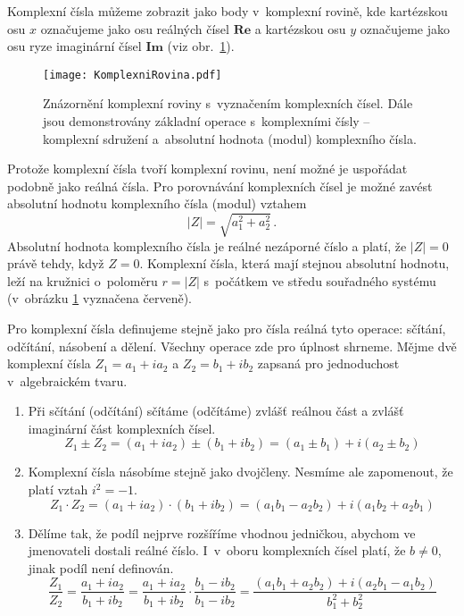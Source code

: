 Komplexní čísla můžeme zobrazit jako body v~komplexní rovině, kde kartézskou osu $x$ označujeme jako osu reálných čísel $\mathbf{Re}$ a kartézskou osu $y$ označujeme jako osu ryze imaginární čísel $\mathbf{Im}$ (viz obr.~\ref{obr:RovinaKomplexnichCisel}).
\begin{figure} [ht]
\centering
\texttt{[image: KomplexniRovina.pdf]}
\caption[Komplexní rovina]{Znázornění komplexní roviny s~vyznačením komplexních čísel. Dále jsou demonstrovány základní operace s~komplexními čísly -- komplexní sdružení a~absolutní hodnota (modul) komplexního čísla.}
\label{obr:RovinaKomplexnichCisel}
\end{figure}

Protože komplexní čísla tvoří komplexní rovinu, není možné je uspořádat podobně jako reálná čísla. Pro porovnávání komplexních čísel je možné zavést absolutní hodnotu komplexního čísla (modul) vztahem
\begin{equation}
|Z| = \sqrt{a_1^2 + a_2^2} \, \mbox{.}
\label{rov:AbsolutniHodnotaKomplex}
\end{equation}
Absolutní hodnota komplexního čísla je reálné nezáporné číslo a platí, že $|Z| = 0$ právě tehdy, když $Z = 0$. Komplexní čísla, která mají stejnou absolutní hodnotu, leží na kružnici o~poloměru $r = |Z|$ s~počátkem ve středu souřadného systému (v~obrázku \ref{obr:RovinaKomplexnichCisel} vyznačena červeně).

Pro komplexní čísla definujeme stejně jako pro čísla reálná tyto operace: sčítání, odčítání, násobení a dělení. Všechny operace zde pro úplnost shrneme. Mějme dvě komplexní čísla $Z_1 = a_1 + ia_2$ a $Z_2=b_1 + ib_2$ zapsaná pro jednoduchost v~algebraickém tvaru.
\begin{enumerate}
\item Při sčítání (odčítání) sčítáme (odčítáme) zvlášť reálnou část a zvlášť imaginární část komplexních čísel.
\begin{equation}
Z_1 \pm Z_2 = (a_1 + ia_2) \pm (b_1 + ib_2) = (a_1 \pm b_1) + i(a_2 \pm b_2)
\label{rov:ScitaniOdcitaniKomplex}
\end{equation}
\item Komplexní čísla násobíme stejně jako dvojčleny. Nesmíme ale zapomenout, že platí vztah $i^2 = -1$.
\begin{equation}
Z_1 \cdot Z_2 = (a_1 + ia_2) \cdot (b_1 + ib_2) = (a_1b_1 - a_2b_2) + i(a_1b_2 + a_2b_1)
\label{rov:NasobeniKomplex}
\end{equation}
\item Dělíme tak, že podíl nejprve rozšíříme vhodnou jedničkou, abychom ve jmenovateli dostali reálné číslo. I~v~oboru komplexních čísel platí, že $b \not = 0$, jinak podíl není definován.
\begin{equation}
\frac{Z_1}{Z_2} = \frac{a_1 + ia_2}{b_1 + ib_2} = \frac{a_1 + ia_2}{b_1 + ib_2} \cdot \frac{b_1 - ib_2}{b_1 - ib_2} = \frac{(a_1b_1 + a_2b_2) + i(a_2b_1 - a_1b_2)}{b_1^2 + b_2^2}
\label{rov:DeleniKomplex}
\end{equation} 
\end{enumerate}

